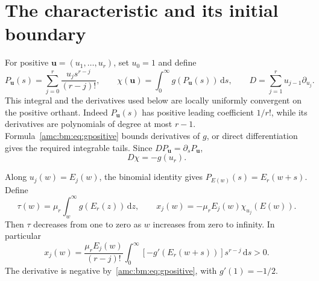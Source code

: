 \documentclass[11pt,letterpaper]{article}
\theoremstyle{remark}\newtheorem{remark}[theorem]{Remark}
\newcommand{\dd}{\,\mathrm d}
\newcommand{\bu}{\boldsymbol u}
\begin{document}
\section{The characteristic and its initial boundary}\label{amc:bm:sec:calibration}
For positive $\bu=(u_1,\ldots,u_r)$, set $u_0=1$ and define
\begin{equation}\label{amc:bm:eq:chi}
 P_{\bu}(s)=\sum_{j=0}^r\frac{u_js^{r-j}}{(r-j)!},\qquad
 \chi(\bu)=\int_0^\infty g(P_{\bu}(s))\dd s,
 \qquad D=\sum_{j=1}^r u_{j-1}\partial_{u_j}.
\end{equation}
This integral and the derivatives used below are locally uniformly convergent on the positive orthant. Indeed $P_{\bu}(s)$ has positive leading coefficient $1/r!$, while its derivatives are polynomials of degree at most $r-1$. Formula~\eqref{amc:bm:eq:gpositive} bounds derivatives of $g$, or direct differentiation gives the required integrable tails. Since $DP_{\bu}=\partial_sP_{\bu}$,
\begin{equation}\label{amc:bm:eq:Dchi}
 D\chi=-g(u_r).
\end{equation}

Along $u_j(w)=E_j(w)$, the binomial identity gives $P_{E(w)}(s)=E_r(w+s)$. Define
\begin{equation}\label{amc:bm:eq:path}
 \tau(w)=\mu_r\int_w^\infty g(E_r(z))\dd z,
 \qquad x_j(w)=-\mu_rE_j(w)\chi_{u_j}(E(w)).
\end{equation}
Then $\tau$ decreases from one to zero as $w$ increases from zero to infinity. In particular
\begin{equation}\label{amc:bm:eq:positivepath}
 x_j(w)=\frac{\mu_rE_j(w)}{(r-j)!}
 \int_0^\infty[-g'(E_r(w+s))]s^{r-j}\dd s>0.
\end{equation}
The derivative is negative by~\eqref{amc:bm:eq:gpositive}, with $g'(1)=-1/2$.
\end{document}
